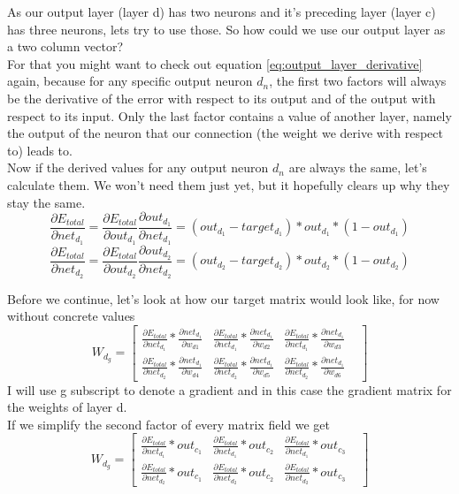 \documentclass[11pt, halfparskip]{article}
\begin{document}
    \noindent \newline
    As our output layer (layer d) has two neurons and it's preceding layer (layer c) has three neurons, lets try to use those. So how could we use our output layer as a two column
    vector?\\
    For that you might want to check out equation \ref{eq:output_layer_derivative} again, because for any specific output neuron $d_n$, the first two factors will always be the derivative
    of the error with respect to its output and of the output with respect to its input. Only the last factor contains a value of another layer, namely the output of the neuron that our
    connection (the weight we derive with respect to) leads to.\\
    Now if the derived values for any output neuron $d_n$ are always the same, let's calculate them. We won't need them just yet, but it hopefully clears up why they stay the same.\\
    \[
	\frac{\partial E_{total}}{\partial net_{d_1}} = \frac{\partial E_{total}}{\partial out_{d_1}} \frac{\partial out_{d_1}}{\partial net_{d_1}} = (out_{d_1} - target_{d_1}) * 
	out_{d_1} * (1 - out_{d_1})
    \]
    \[
	\frac{\partial E_{total}}{\partial net_{d_2}} = \frac{\partial E_{total}}{\partial out_{d_2}} \frac{\partial out_{d_2}}{\partial net_{d_2}} = (out_{d_2} - target_{d_2}) * 
	out_{d_2} * (1 - out_{d_2})
    \]
    
    \newpage
    \noindent
    Before we continue, let's look at how our target matrix would look like, for now without concrete values
    \[
    	W_{d_g} = 
    	\begin{bmatrix}
    		\frac{\partial E_{total}}{\partial net_{d_1}} * \frac{\partial net_ {d_1}}{\partial w_{d1}} & 
    		\frac{\partial E_{total}}{\partial net_{d_1}} * \frac{\partial net_ {d_1}}{\partial w_{d2}} & 
    		\frac{\partial E_{total}}{\partial net_{d_1}} * \frac{\partial net_ {d_1}}{\partial w_{d3}} & \\
    		\frac{\partial E_{total}}{\partial net_{d_2}} * \frac{\partial net_ {d_1}}{\partial w_{d4}} &
    		\frac{\partial E_{total}}{\partial net_{d_2}} * \frac{\partial net_ {d_1}}{\partial w_{d5}} & 
    		\frac{\partial E_{total}}{\partial net_{d_2}} * \frac{\partial net_ {d_1}}{\partial w_{d6}}
    	\end{bmatrix}
    \]
    I will use g subscript to denote a gradient and in this case the gradient matrix for the weights of layer d.\\
    If we simplify the second factor of every matrix field we get
    \[
    	W_{d_g} = 
    	\begin{bmatrix}
	    	\frac{\partial E_{total}}{\partial net_{d_1}} * out_{c_1} & 
    		\frac{\partial E_{total}}{\partial net_{d_1}} * out_{c_2} & 
    		\frac{\partial E_{total}}{\partial net_{d_1}} * out_{c_3} & \\
    		\frac{\partial E_{total}}{\partial net_{d_2}} * out_{c_1} &
    		\frac{\partial E_{total}}{\partial net_{d_2}} * out_{c_2} & 
    		\frac{\partial E_{total}}{\partial net_{d_2}} * out_{c_3}
    	\end{bmatrix}
    \]
    
\end{document}
